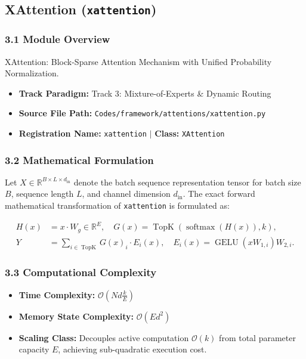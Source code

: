 \subsection{XAttention (\texttt{xattention})}
\label{sec:app_module_xattention}

\subsubsection*{3.1 Module Overview}
XAttention: Block-Sparse Attention Mechanism with Unified Probability Normalization.
\begin{itemize}
    \item \textbf{Track Paradigm:} Track 3: Mixture-of-Experts \& Dynamic Routing
    \item \textbf{Source File Path:} \texttt{Codes/framework/attentions/xattention.py}
    \item \textbf{Registration Name:} \texttt{xattention} $\mid$ \textbf{Class:} \texttt{XAttention}
\end{itemize}

\subsubsection*{3.2 Mathematical Formulation}
Let $X \in \mathbb{R}^{B \times L \times d_{\text{in}}}$ denote the batch sequence representation tensor for batch size $B$, sequence length $L$, and channel dimension $d_{\text{in}}$. The exact forward mathematical transformation of \texttt{xattention} is formulated as:

\begin{align}
H(x) &= x \cdot W_g \in \mathbb{R}^{E}, \quad G(x) = \operatorname{TopK}\left(\operatorname{softmax}(H(x)), k\right), \\
Y &= \sum_{i \in \operatorname{TopK}} G(x)_i \cdot E_i(x), \quad E_i(x) = \operatorname{GELU}(x W_{1, i}) W_{2, i}.
\end{align}


\subsubsection*{3.3 Computational Complexity}
\begin{itemize}
    \item \textbf{Time Complexity:} $\mathcal{O}(N d \frac{k}{E})$
    \item \textbf{Memory State Complexity:} $\mathcal{O}(E d^2)$
    \item \textbf{Scaling Class:} Decouples active computation $\mathcal{O}(k)$ from total parameter capacity $E$, achieving sub-quadratic execution cost.
\end{itemize}

